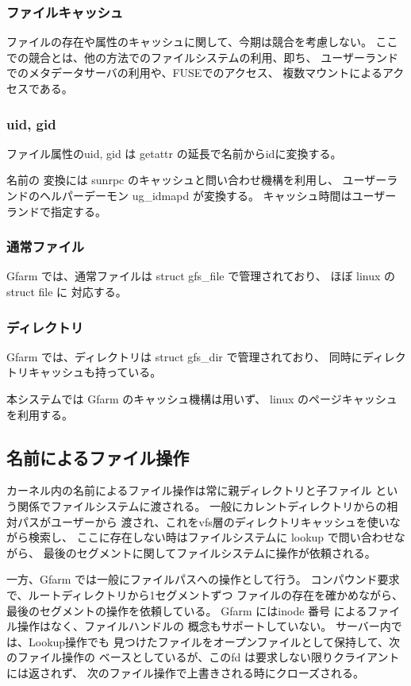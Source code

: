 \subsubsection{ファイルキャッシュ}
	ファイルの存在や属性のキャッシュに関して、今期は競合を考慮しない。
	ここでの競合とは、他の方法でのファイルシステムの利用、即ち、
	ユーザーランドでのメタデータサーバの利用や、FUSEでのアクセス、
	複数マウントによるアクセスである。

\subsubsection{uid, gid}
	ファイル属性のuid, gid は getattr の延長で名前からidに変換する。

	名前の 変換には sunrpc のキャッシュと問い合わせ機構を利用し、
	ユーザーランドのヘルパーデーモン ug_idmapd が変換する。
	キャッシュ時間はユーザーランドで指定する。

\subsubsection{通常ファイル}
	Gfarm では、通常ファイルは struct gfs_file で管理されており、
	ほぼ linux の struct file に 対応する。

\subsubsection{ディレクトリ}
	Gfarm では、ディレクトリは struct gfs_dir で管理されており、
	同時にディレクトリキャッシュも持っている。
	
	本システムでは Gfarm のキャッシュ機構は用いず、
	linux のページキャッシュを利用する。

\subsection{名前によるファイル操作}
	カーネル内の名前によるファイル操作は常に親ディレクトリと子ファイル
	という関係でファイルシステムに渡される。
	一般にカレントディレクトリからの相対パスがユーザーから
	渡され、これをvfs層のディレクトリキャッシュを使いながら検索し、
	ここに存在しない時はファイルシステムに lookup で問い合わせながら、
	最後のセグメントに関してファイルシステムに操作が依頼される。


	一方、Gfarm では一般にファイルパスへの操作として行う。
	コンパウンド要求で、ルートディレクトリから1セグメントずつ
	ファイルの存在を確かめながら、最後のセグメントの操作を依頼している。
	Gfarm にはinode 番号 によるファイル操作はなく、ファイルハンドルの
	概念もサポートしていない。
	サーバー内では、Lookup操作でも
	見つけたファイルをオープンファイルとして保持して、次のファイル操作の
	ベースとしているが、このfd は要求しない限りクライアントには返されず、
	次のファイル操作で上書きされる時にクローズされる。

